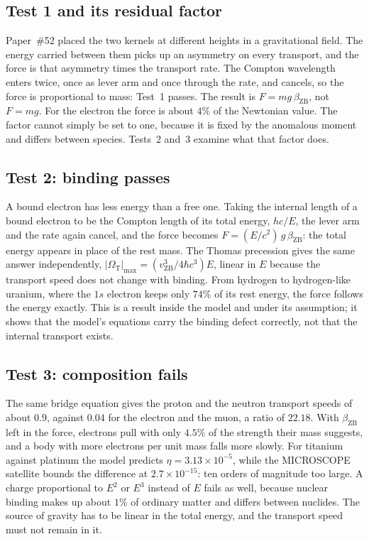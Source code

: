 \documentclass[%
 reprint, amsmath,amssymb, aps, prb, ]{revtex4-2}
\numberwithin{equation}{section}
\newcommand{\vZB}{v_{\text{ZB}}}
\newcommand{\betaZB}{\beta_{\text{ZB}}}
\newcommand{\OmT}{\Omega_{\text{T}}}
\begin{document}
\subsection{Test 1 and its residual factor}

Paper~\#52 placed the two kernels at different heights in a gravitational field. The energy carried between them picks up an asymmetry on every transport, and the force is that asymmetry times the transport rate. The Compton wavelength enters twice, once as lever arm and once through the rate, and cancels, so the force is proportional to mass: Test~1 passes. The result is $F = mg\,\betaZB$, not $F = mg$. For the electron the force is about $4\%$ of the Newtonian value. The factor cannot simply be set to one, because it is fixed by the anomalous moment and differs between species. Tests~2 and~3 examine what that factor does.

\subsection{Test 2: binding passes}

A bound electron has less energy than a free one. Taking the internal length of a bound electron to be the Compton length of its total energy, $hc/E$, the lever arm and the rate again cancel, and the force becomes $F = (E/c^{2})\,g\,\betaZB$: the total energy appears in place of the rest mass. The Thomas precession gives the same answer independently, $\lvert\OmT\rvert_{\max} = (\vZB^{3}/4\hbar c^{3})E$, linear in $E$ because the transport speed does not change with binding. From hydrogen to hydrogen-like uranium, where the $1s$ electron keeps only $74\%$ of its rest energy, the force follows the energy exactly. This is a result inside the model and under its assumption; it shows that the model's equations carry the binding defect correctly, not that the internal transport exists.

\subsection{Test 3: composition fails}

The same bridge equation gives the proton and the neutron transport speeds of about $0.9$, against $0.04$ for the electron and the muon, a ratio of $22.18$. With $\betaZB$ left in the force, electrons pull with only $4.5\%$ of the strength their mass suggests, and a body with more electrons per unit mass falls more slowly. For titanium against platinum the model predicts $\eta = 3.13\times10^{-5}$, while the MICROSCOPE satellite bounds the difference at $2.7\times10^{-15}$: ten orders of magnitude too large. A charge proportional to $E^{2}$ or $E^{3}$ instead of $E$ fails as well, because nuclear binding makes up about $1\%$ of ordinary matter and differs between nuclides. The source of gravity has to be linear in the total energy, and the transport speed must not remain in it.
\end{document}
